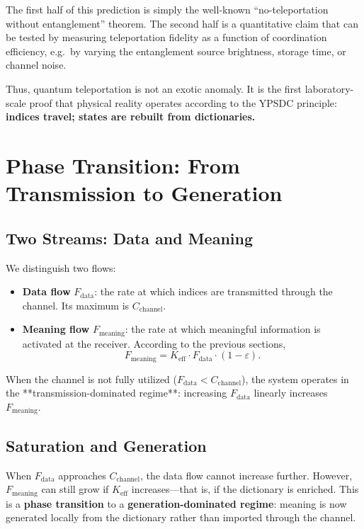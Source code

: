 \documentclass[12pt,a4paper]{article}
\theoremstyle{remark}
\newcommand{\Keff}{K_{\mathrm{eff}}}
\begin{document}
	The first half of this prediction is simply the well-known ``no-teleportation without
	entanglement'' theorem. The second half is a quantitative claim that can be tested by
	measuring teleportation fidelity as a function of coordination efficiency, e.g.\ by
	varying the entanglement source brightness, storage time, or channel noise.
	
	Thus, quantum teleportation is not an exotic anomaly. It is the first laboratory-scale
	proof that physical reality operates according to the YPSDC principle: \textbf{indices
		travel; states are rebuilt from dictionaries.}
	
	\section{Phase Transition: From Transmission to Generation}
	\label{sec:transition}
	
	\subsection{Two Streams: Data and Meaning}
	
	We distinguish two flows:
	\begin{itemize}
		\item \textbf{Data flow} $F_{\text{data}}$: the rate at which indices are transmitted through the channel. Its maximum is $C_{\text{channel}}$.
		\item \textbf{Meaning flow} $F_{\text{meaning}}$: the rate at which meaningful information is activated at the receiver. According to the previous sections,
		\[
		F_{\text{meaning}} = \Keff \cdot F_{\text{data}} \cdot (1 - \varepsilon).
		\]
	\end{itemize}
	
	When the channel is not fully utilized ($F_{\text{data}} < C_{\text{channel}}$), the system operates in the **transmission-dominated regime**: increasing $F_{\text{data}}$ linearly increases $F_{\text{meaning}}$.
	
	\subsection{Saturation and Generation}
	
	When $F_{\text{data}}$ approaches $C_{\text{channel}}$, the data flow cannot increase further. However, $F_{\text{meaning}}$ can still grow if $\Keff$ increases---that is, if the dictionary is enriched. This is a \textbf{phase transition} to a \textbf{generation-dominated regime}: meaning is now generated locally from the dictionary rather than imported through the channel.
	
\end{document}
